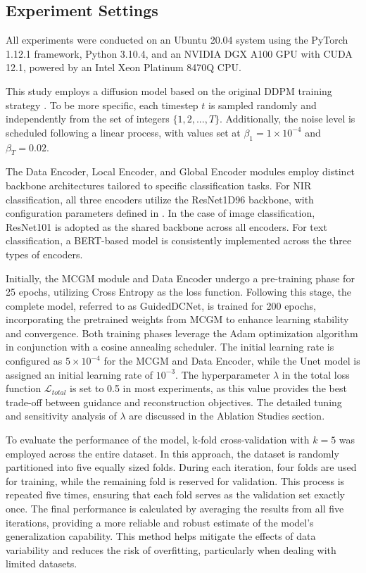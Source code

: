 \documentclass[a4paper,fleqn]{cas-sc}
\begin{document}
\subsection{Experiment Settings}
All experiments were conducted on an Ubuntu 20.04 system using the PyTorch 1.12.1 framework, Python 3.10.4, and an NVIDIA DGX A100 GPU with CUDA 12.1, powered by an Intel Xeon Platinum 8470Q CPU.

This study employs a diffusion model based on the original DDPM training strategy \cite{ho2020denoising}. To be more specific, each timestep \(t\) is sampled randomly and independently from the set of integers \(\{1, 2, ..., T\}\). Additionally, the noise level is scheduled following a linear process, with values set at \( \beta_1 = 1 \times 10^{-4} \) and \( \beta_T = 0.02 \).

The Data Encoder, Local Encoder, and Global Encoder modules employ distinct backbone architectures tailored to specific classification tasks. For NIR classification, all three encoders utilize the ResNet1D96 backbone, with configuration parameters defined in \cite{hong2020holmes}. In the case of image classification, ResNet101 \cite{he2016deep} is adopted as the shared backbone across all encoders. For text classification, a BERT-based \cite{devlin2019bert} model is consistently implemented across the three types of encoders.

Initially, the MCGM module and Data Encoder undergo a pre-training phase for 25 epochs, utilizing Cross Entropy as the loss function. Following this stage, the complete model, referred to as GuidedDCNet, is trained for 200 epochs, incorporating the pretrained weights from MCGM to enhance learning stability and convergence. Both training phases leverage the Adam optimization algorithm in conjunction with a cosine annealing scheduler. The initial learning rate is configured as \(5 \times 10^{-4}\) for the MCGM and Data Encoder, while the Unet model is assigned an initial learning rate of \(10^{-3}\). The hyperparameter \(\lambda\) in the total loss function \(\mathcal{L}_{total}\) is set to 0.5 in most experiments, as this value provides the best trade-off between guidance and reconstruction objectives. The detailed tuning and sensitivity analysis of \(\lambda\) are discussed in the Ablation Studies section.

To evaluate the performance of the model, k-fold cross-validation with \(k = 5\) was employed across the entire dataset. In this approach, the dataset is randomly partitioned into five equally sized folds. During each iteration, four folds are used for training, while the remaining fold is reserved for validation. This process is repeated five times, ensuring that each fold serves as the validation set exactly once. The final performance is calculated by averaging the results from all five iterations, providing a more reliable and robust estimate of the model's generalization capability. This method helps mitigate the effects of data variability and reduces the risk of overfitting, particularly when dealing with limited datasets.
\end{document}
